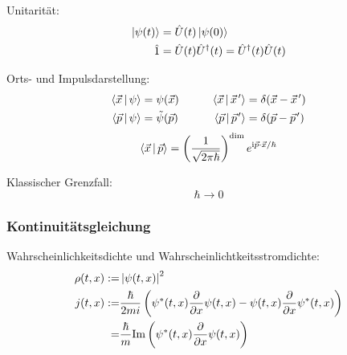 \documentclass[11pt]{article}
\numberwithin{equation}{section}
\begin{document}
			\noindent
			Unitarität:
			\begin{equation}
				\begin{aligned}
					\Ket{\psi(t)} &= \hat{U}(t) \Ket{\psi(0)} \\
					\hat{1} &= \hat{U}(t)\hat{U}^\dagger(t) = \hat{U}^\dagger(t)\hat{U}(t) \\
				\end{aligned}
			\end{equation}

			\noindent
			Orts- und Impulsdarstellung:
			\begin{equation}
				\begin{aligned}
					\Braket{\vec{x} | \psi} &= \psi(\vec{x}) &\hspace{20pt}
					\Braket{\vec{x} | \pvec{x}'} &= \delta(\vec{x} - \pvec{x}') \\
					\Braket{\vec{p} | \psi} &= \tilde{\psi}(\vec{p}) &\hspace{20pt}
					\Braket{\vec{p} | \pvec{p}'} &= \delta(\vec{p} - \pvec{p}') \\
				\end{aligned}
			\end{equation}
			\begin{equation}
				\begin{aligned}
					\Braket{\vec{x} | \vec{p}} &= \left( \frac{1}{\sqrt{2\pi\hbar}} \right)^\mathrm{dim} e^{\mathrm{i} \vec{p}\cdot\vec{x} / \hbar} \\
				\end{aligned}
			\end{equation}

			\noindent
			Klassischer Grenzfall:
			\begin{equation}
				\hbar \rightarrow 0
			\end{equation}

			\subsubsection{Kontinuitätsgleichung}
				\noindent
				Wahrscheinlichkeitsdichte und Wahrscheinlichtkeitsstromdichte:
				\begin{equation}
					\begin{aligned}
						\rho(t,x) :=& \left|\psi(t,x)\right|^2 \\
						j(t,x) :=& \frac{\hbar}{2mi}\left(
							\psi^*(t,x)\frac{\partial }{\partial x}\psi(t,x) - \psi(t,x)\frac{\partial }{\partial x}\psi^*(t,x)
						\right) \\
						=& \frac{\hbar}{m} \mathrm{Im}\left(
							\psi^*(t,x) \frac{\partial }{\partial x}\psi(t,x)
						\right)\\
					\end{aligned}
				\end{equation}
\end{document}
